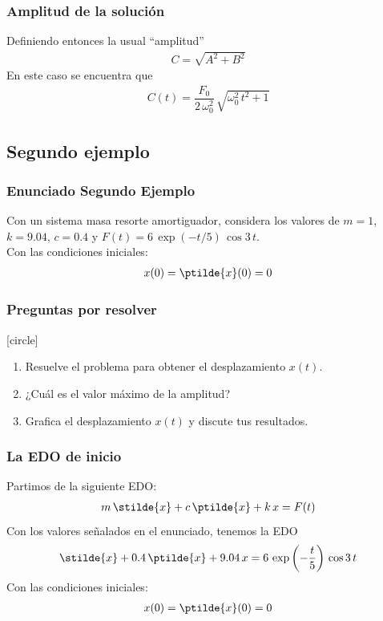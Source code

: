 \begin{frame}
\frametitle{Amplitud de la solución}
Definiendo entonces la usual \enquote{amplitud}
\begin{align*}
C = \sqrt{A^{2} +  B^{2}}
\end{align*}
\pause
En este caso se encuentra que
\begin{align*}
C(t) = \dfrac{F_{0}}{2 \, \omega_{0}^{2}} \, \sqrt{\omega_{0}^{2} \, t^{2} + 1}
\end{align*}
\end{frame}

\subsection{Segundo ejemplo}

\begin{frame}
\frametitle{Enunciado Segundo Ejemplo}
Con un sistema masa resorte amortiguador, considera los valores de $m = 1$, $k = 9.04$, $c= 0.4$ y $F(t) =  6 \, \exp(-t/5) \, \cos 3 \, t$.
\\
\bigskip
Con las condiciones iniciales:
\begin{align*}
x(0) = \ptilde{x}(0) = 0
\end{align*}
\end{frame}
\begin{frame}
\frametitle{Preguntas por resolver}
[circle]
\begin{enumerate}[<+->]
\item Resuelve el problema para obtener el desplazamiento $x(t)$.
\item ¿Cuál es el valor máximo de la amplitud?
\item Grafica el desplazamiento $x(t)$ y discute tus resultados.
\end{enumerate}
\end{frame}
\begin{frame}
\frametitle{La EDO de inicio}
Partimos de la siguiente EDO:
\begin{align*}
m \, \stilde{x} + c \, \ptilde{x} + k \, x = F(t)
\end{align*}
\pause
Con los valores señalados en el enunciado, tenemos la EDO
\begin{align*}
\stilde{x} + 0.4 \, \ptilde{x} + 9.04 \, x = 6 \, \exp\left( -\dfrac{t}{5}\right) \, \cos 3 \, t
\end{align*}
Con las condiciones iniciales:
\begin{align*}
x(0) = \ptilde{x}(0) = 0
\end{align*}
\end{frame}
